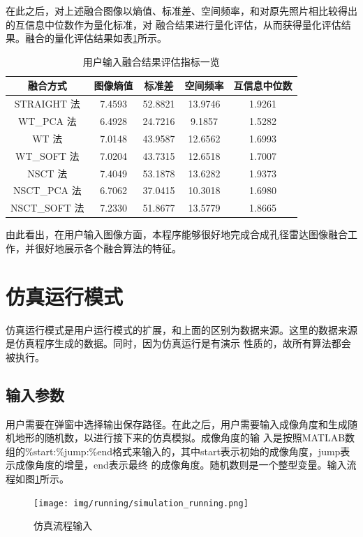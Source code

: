 \documentclass{xduugthesis}
\begin{document}
在此之后，对上述融合图像以熵值、标准差、空间频率，和对原先照片相比较得出的互信息中位数作为量化标准，对
融合结果进行量化评估，从而获得量化评估结果。融合的量化评估结果如表\ref{tank_merge_table}所示。\par
\begin{table}[ht!]
	\caption{用户输入融合结果评估指标一览}\label{tank_merge_table}
	\begin{tabular}{|c|c|c|c|c|}
		\hline
		融合方式 & 图像熵值 & 标准差 & 空间频率 & 互信息中位数 \\
		\hline
		STRAIGHT 法 & 7.4593 & 52.8821 & 13.9746 & 1.9261  \\
		\hline
		WT\_PCA 法 & 6.4928 & 24.7216 & 9.1857 & 1.5282  \\
		\hline
		WT 法 & 7.0148 & 43.9587 & 12.6562 & 1.6993 \\
		\hline
		WT\_SOFT 法 & 7.0204 & 43.7315 & 12.6518 & 1.7007  \\
		\hline
		NSCT 法 & 7.4049 & 53.1878 & 13.6282 & 1.9373 \\
		\hline
		NSCT\_PCA 法 & 6.7062 & 37.0415 & 10.3018 & 1.6980 \\
		\hline
		NSCT\_SOFT 法 & 7.2330 & 51.8677 & 13.5779 & 1.8665 \\
		\hline
	\end{tabular}
\end{table}\par
由此看出，在用户输入图像方面，本程序能够很好地完成合成孔径雷达图像融合工作，并很好地展示各个融合算法的特征。
\section{仿真运行模式}
仿真运行模式是用户运行模式的扩展，和上面的区别为数据来源。这里的数据来源是仿真程序生成的数据。同时，因为仿真运行是有演示
性质的，故所有算法都会被执行。\par
\subsection{输入参数}
用户需要在弹窗中选择输出保存路径。在此之后，用户需要输入成像角度和生成随机地形的随机数，以进行接下来的仿真模拟。成像角度的输
入是按照MATLAB数组的\%start:\%jump:\%end格式来输入的，其中start表示初始的成像角度，jump表示成像角度的增量，end表示最终
的成像角度。随机数则是一个整型变量。输入流程如图\ref{simulation_running}所示。\par
\begin{figure}[!htb]
	\centering
	\texttt{[image: img/running/simulation\_running.png]}
	\caption{仿真流程输入}\label{simulation_running}
\end{figure}
\end{document}
